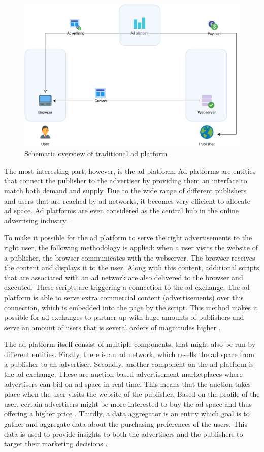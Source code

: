 \begin{figure}[h!]
  \center
  \includegraphics[width=12cm]{images/adplatform.pdf}
  \caption{Schematic overview of traditional ad platform}
\end{figure}

The most interesting part, however, is the ad platform. Ad platforms are entities that connect the publisher to the advertiser by providing them an interface to match both demand and supply. Due to the wide range of different publishers and users that are reached by ad networks, it becomes very efficient to allocate ad space. Ad platforms are even considered as the central hub in the online advertising industry \cite{estrada2017online}.

To make it possible for the ad platform to serve the right advertisements to the right user, the following methodology is applied: when a user visits the website of a publisher, the browser communicates with the webserver. The browser receives the content and displays it to the user. Along with this content, additional scripts that are associated with an ad network are also delivered to the browser and executed. These scripts are triggering a connection to the ad exchange. The ad platform is able to serve extra commercial content (advertisements) over this connection, which is embedded into the page by the script. This method makes it possible for ad exchanges to partner up with huge amounts of publishers and serve an amount of users that is several orders of magnitudes higher \cite{estrada2017online}.

The ad platform itself consist of multiple components, that might also be run by different entities. Firstly, there is an ad network, which resells the ad space from a publisher to an advertiser. Secondly, another component on the ad platform is the ad exchange. These are auction based advertisement marketplaces where advertisers can bid on ad space in real time. This means that the auction takes place when the user visits the website of the publisher. Based on the profile of the user, certain advertisers might be more interested to buy the ad space and thus offering a higher price \cite{estrada2017online}. Thirdly, a data aggregator is an entity which goal is to gather and aggregate data about the purchasing preferences of the users. This data is used to provide insights to both the advertisers and the publishers to target their marketing decisions \cite{estrada2017online}.

